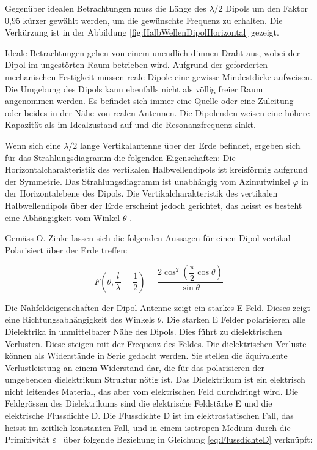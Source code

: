 Gegenüber idealen Betrachtungen muss die Länge des $\lambda /2$ Dipols um den Faktor 0,95 kürzer gewählt werden, um  die gewünschte Frequenz zu erhalten. Die Verkürzung  ist in der Abbildung \ref{fig:HalbWellenDipolHorizontal} gezeigt.

Ideale Betrachtungen gehen von einem unendlich dünnen Draht aus, wobei der Dipol im
ungestörten Raum betrieben wird. Aufgrund der geforderten mechanischen Festigkeit
müssen reale Dipole eine gewisse Mindestdicke aufweisen. Die Umgebung des Dipols kann
ebenfalls nicht als völlig freier Raum angenommen werden. Es befindet sich immer eine Quelle oder eine Zuleitung oder beides in der Nähe von realen Antennen. Die Dipolenden weisen eine höhere Kapazität als im Idealzustand auf und die Resonanzfrequenz sinkt. 

Wenn sich eine $\lambda /2$ lange Vertikalantenne über der Erde befindet,  ergeben sich für das Strahlungsdiagramm die folgenden Eigenschaften: 
Die Horizontalcharakteristik des vertikalen Halbwellendipols ist kreisförmig aufgrund der Symmetrie. Das Strahlungsdiagramm ist unabhängig vom Azimutwinkel $\varphi$ in der Horizontalebene des Dipols. Die Vertikalcharakteristik des vertikalen Halbwellendipols über der Erde erscheint jedoch gerichtet, das heisst es besteht eine Abhängigkeit vom Winkel $\theta$ . 

Gemäss O. Zinke %
 lassen sich die folgenden Aussagen für einen Dipol vertikal Polarisiert über der Erde treffen:


\begin{equation}\label{eq:FDipolTheat}
F(\theta,\frac{l}{\lambda}=\dfrac{1}{2})=\dfrac{2\cos^{2}(\dfrac{\pi}{2}\cos\theta)}{\sin\theta}
\end{equation}


Die Nahfeldeigenschaften der Dipol Antenne zeigt ein starkes E Feld. Dieses zeigt eine Richtungsabhängigkeit  des Winkels $\theta$. Die starken E Felder polarisieren alle Dielektrika in unmittelbarer Nähe des Dipols. Dies führt zu dielektrischen Verlusten. Diese steigen mit der Frequenz des Feldes. Die dielektrischen Verluste können als Widerstände in Serie gedacht werden. Sie stellen die äquivalente Verlustleistung an einem Widerstand dar, die für das polarisieren der umgebenden dielektrikum Struktur nötig ist.
Das Dielektrikum ist ein elektrisch nicht leitendes Material, das aber vom elektrischen Feld durchdringt wird. Die Feldgrössen des Dielektrikums sind die elektrische Feldstärke E und die elektrische Flussdichte D. Die Flussdichte D ist  im elektrostatischen Fall, das heisst im zeitlich konstanten Fall, und in einem isotropen Medium durch die Primitivität $\varepsilon $ \ über folgende Beziehung in Gleichung \ref{eq:FlussdichteD} verknüpft:



